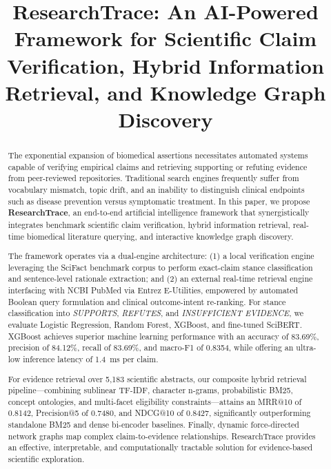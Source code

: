 \documentclass[conference]{IEEEtran}
\begin{document}
\title{ResearchTrace: An AI-Powered Framework for Scientific Claim Verification, Hybrid Information Retrieval, and Knowledge Graph Discovery}

\author{
\and
{}
}

\maketitle

\begin{abstract}
The exponential expansion of biomedical assertions necessitates automated systems capable of verifying empirical claims and retrieving supporting or refuting evidence from peer-reviewed repositories. Traditional search engines frequently suffer from vocabulary mismatch, topic drift, and an inability to distinguish clinical endpoints such as disease prevention versus symptomatic treatment. In this paper, we propose \textbf{ResearchTrace}, an end-to-end artificial intelligence framework that synergistically integrates benchmark scientific claim verification, hybrid information retrieval, real-time biomedical literature querying, and interactive knowledge graph discovery.

The framework operates via a dual-engine architecture: (1) a local verification engine leveraging the SciFact benchmark corpus to perform exact-claim stance classification and sentence-level rationale extraction; and (2) an external real-time retrieval engine interfacing with NCBI PubMed via Entrez E-Utilities, empowered by automated Boolean query formulation and clinical outcome-intent re-ranking. For stance classification into \textit{SUPPORTS}, \textit{REFUTES}, and \textit{INSUFFICIENT EVIDENCE}, we evaluate Logistic Regression, Random Forest, XGBoost, and fine-tuned SciBERT. XGBoost achieves superior machine learning performance with an accuracy of 83.69\%, precision of 84.12\%, recall of 83.69\%, and macro-F1 of 0.8354, while offering an ultra-low inference latency of 1.4~ms per claim. 

For evidence retrieval over 5,183 scientific abstracts, our composite hybrid retrieval pipeline—combining sublinear TF-IDF, character n-grams, probabilistic BM25, concept ontologies, and multi-facet eligibility constraints—attains an MRR@10 of 0.8142, Precision@5 of 0.7480, and NDCG@10 of 0.8427, significantly outperforming standalone BM25 and dense bi-encoder baselines. Finally, dynamic force-directed network graphs map complex claim-to-evidence relationships. ResearchTrace provides an effective, interpretable, and computationally tractable solution for evidence-based scientific exploration.
\end{abstract}
\end{document}
